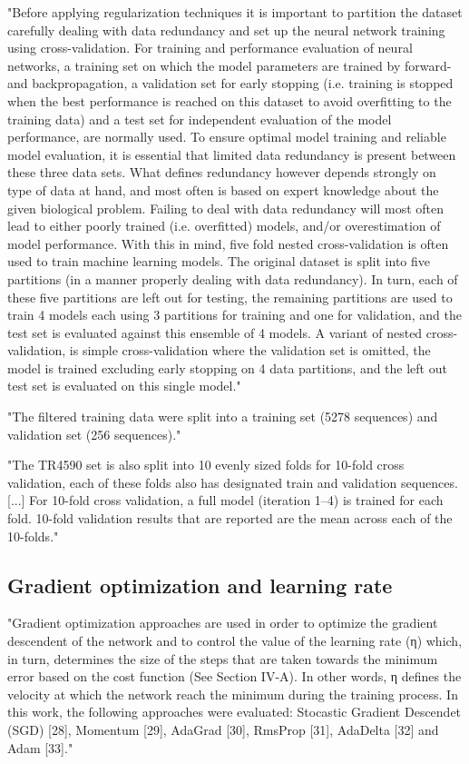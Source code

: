 \documentclass[]{scrartcl}
\begin{document}
"Before applying regularization techniques it is important to partition the dataset carefully dealing with data redundancy and set up the neural network training using cross-validation. For training and performance evaluation of neural networks, a training set on which the model parameters are trained by forward- and backpropagation, a validation set for early stopping (i.e. training is stopped when the best performance is reached on this dataset to avoid overfitting to the training data) and a test set for independent evaluation of the model performance, are normally used. To ensure optimal model training and reliable model evaluation, it is essential that limited data redundancy is present between these three data sets. What defines redundancy however depends strongly on type of data at hand, and most often is based on expert knowledge about the given biological problem. Failing to deal with data redundancy will most often lead to either poorly trained (i.e. overfitted) models, and/or overestimation of model performance. With this in mind, five fold nested cross-validation is often used to train machine learning models. The original dataset is split into five partitions (in a manner properly dealing with data redundancy). In turn, each of these five partitions are left out for testing, the remaining partitions are used to train 4 models each using 3 partitions for training and one for validation, and the test set is evaluated against this ensemble of 4 models. A variant of nested cross-validation, is simple cross-validation where the validation set is omitted, the model is trained excluding early stopping on 4 data partitions, and the left out test set is evaluated on this single model." \cite{Jurtz2017}

"The filtered training data were split into a training set (5278 sequences) and validation set (256 sequences)." \cite{Jurtz2017}

"The TR4590 set is also split into 10 evenly sized folds for 10-fold cross validation, each of these folds also has designated train and validation sequences. [...] For 10-fold cross validation, a full model (iteration 1–4) is trained for each fold. 10-fold validation results that are reported are the mean across each of the 10-folds." \cite{Heffernan2017}

\subsection{Gradient optimization and learning rate}
"Gradient optimization approaches are used in order to optimize the gradient descendent of the network and to control the value of the learning rate (η) which, in turn, determines the size of the steps that are taken towards the minimum error based on the cost function (See Section IV-A). In other words, η defines the velocity at which the network reach the minimum during the training process. In this work, the following approaches were evaluated: Stocastic Gradient Descendet (SGD) [28], Momentum [29], AdaGrad [30], RmsProp [31], AdaDelta [32] and Adam [33]." \cite{Hattori2017}
\end{document}
